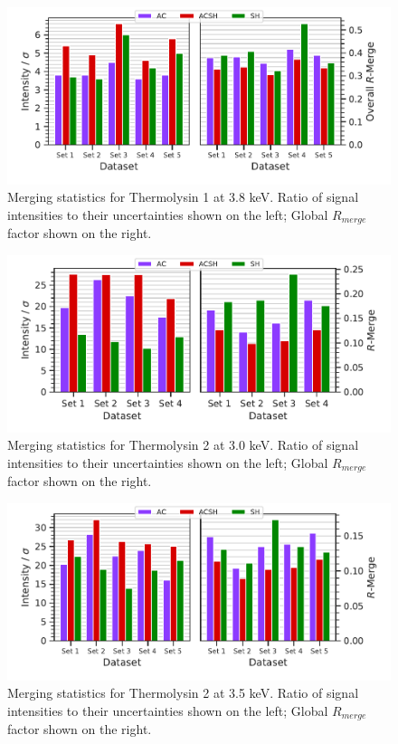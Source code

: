 \begin{figure}
    \centering
    \includegraphics{plots/exp1/tlys_9_P6122/3p8_stats_grid.pdf}
    \caption{Merging statistics for Thermolysin 1 at 3.8 \unit{keV}. Ratio of signal intensities to their uncertainties shown on the left; Global $R_{merge}$ factor shown on the right.}
    \label{fig:tlys_9_3p8}
\end{figure}


\begin{figure}
    \centering
    \includegraphics{plots/exp1/tlys_2_P6122/3p0_stats_grid.pdf}
    \caption{Merging statistics for Thermolysin 2 at 3.0 \unit{keV}. Ratio of signal intensities to their uncertainties shown on the left; Global $R_{merge}$ factor shown on the right.}
    \label{fig:tlys_2_3p0}
\end{figure}

\begin{figure}
    \centering
    \includegraphics{plots/exp1/tlys_2_P6122/3p5_stats_grid.pdf}
    \caption{Merging statistics for Thermolysin 2 at 3.5 \unit{keV}. Ratio of signal intensities to their uncertainties shown on the left; Global $R_{merge}$ factor shown on the right.}
    \label{fig:tlys_2_3p5}
\end{figure}



